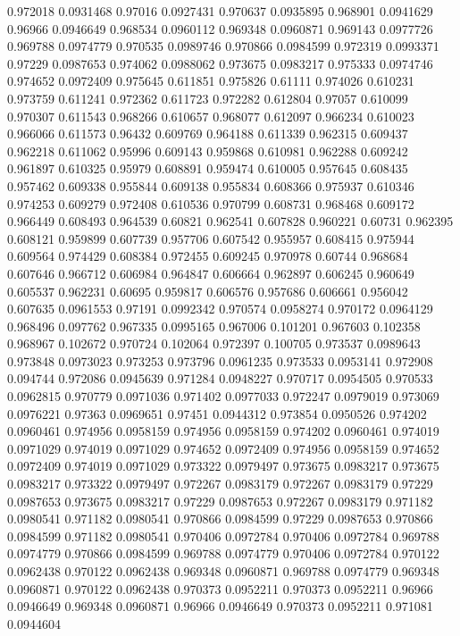 0.972018 0.0931468
0.97016 0.0927431
0.970637 0.0935895
0.968901 0.0941629
0.96966 0.0946649
0.968534 0.0960112
0.969348 0.0960871
0.969143 0.0977726
0.969788 0.0974779
0.970535 0.0989746
0.970866 0.0984599
0.972319 0.0993371
0.97229 0.0987653
0.974062 0.0988062
0.973675 0.0983217
0.975333 0.0974746
0.974652 0.0972409
0.975645 0.611851
0.975826 0.61111
0.974026 0.610231
0.973759 0.611241
0.972362 0.611723
0.972282 0.612804
0.97057 0.610099
0.970307 0.611543
0.968266 0.610657
0.968077 0.612097
0.966234 0.610023
0.966066 0.611573
0.96432 0.609769
0.964188 0.611339
0.962315 0.609437
0.962218 0.611062
0.95996 0.609143
0.959868 0.610981
0.962288 0.609242
0.961897 0.610325
0.95979 0.608891
0.959474 0.610005
0.957645 0.608435
0.957462 0.609338
0.955844 0.609138
0.955834 0.608366
0.975937 0.610346
0.974253 0.609279
0.972408 0.610536
0.970799 0.608731
0.968468 0.609172
0.966449 0.608493
0.964539 0.60821
0.962541 0.607828
0.960221 0.60731
0.962395 0.608121
0.959899 0.607739
0.957706 0.607542
0.955957 0.608415
0.975944 0.609564
0.974429 0.608384
0.972455 0.609245
0.970978 0.60744
0.968684 0.607646
0.966712 0.606984
0.964847 0.606664
0.962897 0.606245
0.960649 0.605537
0.962231 0.60695
0.959817 0.606576
0.957686 0.606661
0.956042 0.607635
0.0961553 0.97191
0.0992342 0.970574
0.0958274 0.970172
0.0964129 0.968496
0.097762 0.967335
0.0995165 0.967006
0.101201 0.967603
0.102358 0.968967
0.102672 0.970724
0.102064 0.972397
0.100705 0.973537
0.0989643 0.973848
0.0973023 0.973253
0.973796 0.0961235
0.973533 0.0953141
0.972908 0.094744
0.972086 0.0945639
0.971284 0.0948227
0.970717 0.0954505
0.970533 0.0962815
0.970779 0.0971036
0.971402 0.0977033
0.972247 0.0979019
0.973069 0.0976221
0.97363 0.0969651
0.97451 0.0944312
0.973854 0.0950526
0.974202 0.0960461
0.974956 0.0958159
0.974956 0.0958159
0.974202 0.0960461
0.974019 0.0971029
0.974019 0.0971029
0.974652 0.0972409
0.974956 0.0958159
0.974652 0.0972409
0.974019 0.0971029
0.973322 0.0979497
0.973675 0.0983217
0.973675 0.0983217
0.973322 0.0979497
0.972267 0.0983179
0.972267 0.0983179
0.97229 0.0987653
0.973675 0.0983217
0.97229 0.0987653
0.972267 0.0983179
0.971182 0.0980541
0.971182 0.0980541
0.970866 0.0984599
0.97229 0.0987653
0.970866 0.0984599
0.971182 0.0980541
0.970406 0.0972784
0.970406 0.0972784
0.969788 0.0974779
0.970866 0.0984599
0.969788 0.0974779
0.970406 0.0972784
0.970122 0.0962438
0.970122 0.0962438
0.969348 0.0960871
0.969788 0.0974779
0.969348 0.0960871
0.970122 0.0962438
0.970373 0.0952211
0.970373 0.0952211
0.96966 0.0946649
0.969348 0.0960871
0.96966 0.0946649
0.970373 0.0952211
0.971081 0.0944604
